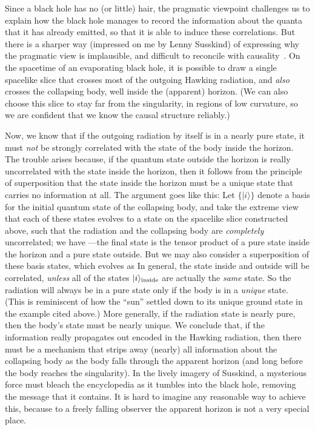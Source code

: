 Since a black hole has no (or little) hair, the pragmatic viewpoint challenges
us to
explain how the black hole manages to record the information about the quanta
that it has already emitted, so that it is able to induce these correlations.
But there is a sharper way (impressed on me by Lenny Susskind) of expressing
why the pragmatic view is implausible, and difficult to reconcile with
causality\lref{}\lref{}~.  On the spacetime of
an evaporating black hole, it is possible to
draw a single spacelike slice that crosses most of the outgoing Hawking
radiation, and {\it also} crosses the collapsing body, well inside the
(apparent) horizon.  (We can also choose this slice to stay far from the
singularity, in regions of low curvature, so we are confident that we know the
causal structure reliably.)

\def\ket#1{|#1\rangle}
Now, we know that if the outgoing radiation by itself is in a nearly pure
state, it must {\it not} be strongly correlated with the state of the body
inside the horizon.  The trouble arises because, if the quantum state outside
the horizon is really uncorrelated with the state inside the horizon, then it
follows from the principle of superposition that the state inside the horizon
must be a unique state that carries no information at all.  The argument goes
like this:  Let $\{\ket{i}\}$ denote a basis for the initial quantum state of
the collapsing body, and take the extreme view that each of these states
evolves to a state on the  spacelike slice constructed above, such that the
radiation and the collapsing body are {\it completely} uncorrelated; we have
\eqn\ia{\ket{i}\longrightarrow\ket{i}_{\rm inside}\otimes\ket{i}_{\rm outside}}
%
---the final state is the tensor product of a pure state inside the horizon and
a pure state outside.  But we may also consider a superposition of these basis
states, which evolves as
\eqn\ib{\sum_i c_i\ket{i}\longrightarrow\sum_i c_i\left(\ket{i}_{\rm
inside}\otimes\ket{i}_{\rm outside}\right).}
%
In general, the state inside and outside will be correlated, {\it unless} all
of the states $\ket{i}_{\rm inside}$ are actually the {\it same} state.  So the
radiation will always be in a pure state only if the body is in a {\it unique}
state.
(This is reminiscent of how the ``sun'' settled down to its unique ground state
in the example cited above.)
More generally, if the radiation state is nearly pure, then the body's state
must be nearly unique.
We conclude that, if the information really
propagates out encoded in the Hawking radiation, then there must be a mechanism
that strips away (nearly) all information about the collapsing body as the body
falls through the apparent horizon (and long before the body reaches the
singularity).  In the lively imagery of Susskind\susskind, a mysterious force
must bleach the encyclopedia as it tumbles into the black hole, removing the
message that it contains.  It is hard to imagine any reasonable way to achieve
this,
because to a freely falling observer the apparent horizon is not a very special
place.


